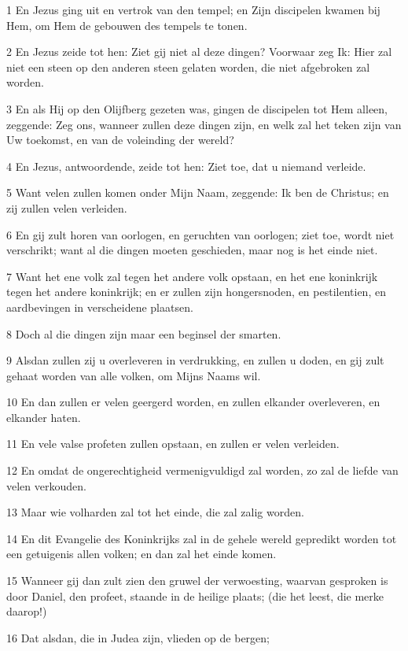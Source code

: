 \par 1 En Jezus ging uit en vertrok van den tempel; en Zijn discipelen kwamen bij Hem, om Hem de gebouwen des tempels te tonen.
\par 2 En Jezus zeide tot hen: Ziet gij niet al deze dingen? Voorwaar zeg Ik: Hier zal niet een steen op den anderen steen gelaten worden, die niet afgebroken zal worden.
\par 3 En als Hij op den Olijfberg gezeten was, gingen de discipelen tot Hem alleen, zeggende: Zeg ons, wanneer zullen deze dingen zijn, en welk zal het teken zijn van Uw toekomst, en van de voleinding der wereld?
\par 4 En Jezus, antwoordende, zeide tot hen: Ziet toe, dat u niemand verleide.
\par 5 Want velen zullen komen onder Mijn Naam, zeggende: Ik ben de Christus; en zij zullen velen verleiden.
\par 6 En gij zult horen van oorlogen, en geruchten van oorlogen; ziet toe, wordt niet verschrikt; want al die dingen moeten geschieden, maar nog is het einde niet.
\par 7 Want het ene volk zal tegen het andere volk opstaan, en het ene koninkrijk tegen het andere koninkrijk; en er zullen zijn hongersnoden, en pestilentien, en aardbevingen in verscheidene plaatsen.
\par 8 Doch al die dingen zijn maar een beginsel der smarten.
\par 9 Alsdan zullen zij u overleveren in verdrukking, en zullen u doden, en gij zult gehaat worden van alle volken, om Mijns Naams wil.
\par 10 En dan zullen er velen geergerd worden, en zullen elkander overleveren, en elkander haten.
\par 11 En vele valse profeten zullen opstaan, en zullen er velen verleiden.
\par 12 En omdat de ongerechtigheid vermenigvuldigd zal worden, zo zal de liefde van velen verkouden.
\par 13 Maar wie volharden zal tot het einde, die zal zalig worden.
\par 14 En dit Evangelie des Koninkrijks zal in de gehele wereld gepredikt worden tot een getuigenis allen volken; en dan zal het einde komen.
\par 15 Wanneer gij dan zult zien den gruwel der verwoesting, waarvan gesproken is door Daniel, den profeet, staande in de heilige plaats; (die het leest, die merke daarop!)
\par 16 Dat alsdan, die in Judea zijn, vlieden op de bergen;

